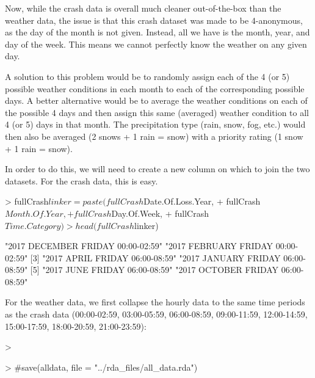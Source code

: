 \documentclass[11pt, a4paper]{article}
\begin{document}
Now, while the crash data is overall much cleaner out-of-the-box than the weather data, the issue is that this crash dataset was made to be 4-anonymous, as the day of the month is not given. Instead, all we have is the month, year, and day of the week. This means we cannot perfectly know the weather on any given day. \par
A solution to this problem would be to randomly assign each of the 4 (or 5) possible weather conditions in each month to each of the corresponding possible days. A better alternative would be to average the weather conditions on each of the possible 4 days and then assign this same (averaged) weather condition to all 4 (or 5) days in that month. The precipitation type (rain, snow, fog, etc.) would then also be averaged (2 snows + 1 rain = snow) with a priority rating (1 snow + 1 rain = snow). 
\par
In order to do this, we will need to create a new column on which to join the two datasets. For the crash data, this is easy. 

\begin{Schunk}
\begin{Sinput}
> fullCrash$linker = paste(fullCrash$Date.Of.Loss.Year,
+                          fullCrash$Month.Of.Year, 
+                          fullCrash$Day.Of.Week,
+                          fullCrash$Time.Category)
> head(fullCrash$linker)
\end{Sinput}
\begin{Soutput}
[1] "2017 DECEMBER FRIDAY 00:00-02:59" "2017 FEBRUARY FRIDAY 00:00-02:59"
[3] "2017 APRIL FRIDAY 06:00-08:59"    "2017 JANUARY FRIDAY 06:00-08:59" 
[5] "2017 JUNE FRIDAY 06:00-08:59"     "2017 OCTOBER FRIDAY 06:00-08:59" 
\end{Soutput}
\end{Schunk}


For the weather data, we first collapse the hourly data to the same time periods as the crash data (00:00-02:59, 03:00-05:59, 06:00-08:59, 09:00-11:59, 12:00-14:59, 15:00-17:59, 18:00-20:59, 21:00-23:59):

\begin{Schunk}
\begin{Sinput}
> 
\end{Sinput}
\end{Schunk}



\begin{Schunk}
\begin{Sinput}
> #save(alldata, file = "../rda_files/all_data.rda")
\end{Sinput}
\end{Schunk}
\end{document}
